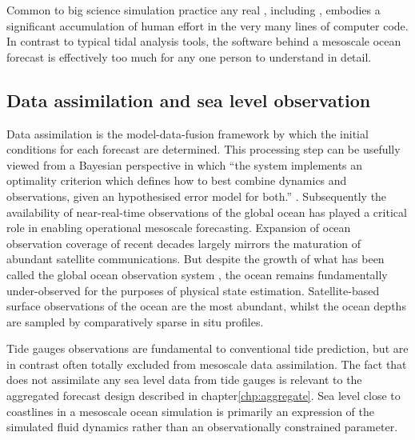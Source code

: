Common to big science simulation practice \citep{Petersen:2012tr} any real \OGCM{}, including \BL{}, embodies a significant accumulation of human effort in the very many lines of computer code.  In contrast to typical tidal analysis tools, the software behind a mesoscale ocean forecast is effectively too much for any one person to understand in detail.
\subsection{Data assimilation and sea level observation}
Data assimilation is the model-data-fusion framework by which the initial conditions for each \OGCM{} forecast are determined.
This processing step can be usefully viewed from a Bayesian perspective in which ``the system implements an optimality criterion which defines how to best combine dynamics and observations, given an hypothesised error model for both.'' \citep{10.1007/978-94-007-0332-2_13}.
Subsequently the availability of near-real-time observations of the global ocean has played a critical role in enabling operational mesoscale forecasting.  Expansion of ocean observation coverage of recent decades largely mirrors the maturation of abundant satellite communications.  But despite the growth of what has been called the global ocean observation system \GOOS{} \citep{Komen:1999ch}, the ocean remains fundamentally under-observed for the purposes of physical state estimation.   Satellite-based surface observations of the ocean are the most abundant, whilst the ocean depths are sampled by comparatively sparse in situ profiles.


Tide gauges observations are fundamental to conventional tide prediction, but are in contrast often totally excluded from mesoscale data assimilation.   The fact that \BL{} does not assimilate any sea level data from tide gauges is relevant to the aggregated forecast design described in chapter\ref{chp:aggregate}.      
Sea level close to coastlines in a mesoscale ocean simulation is primarily an expression of the simulated fluid dynamics rather than an observationally constrained parameter.

